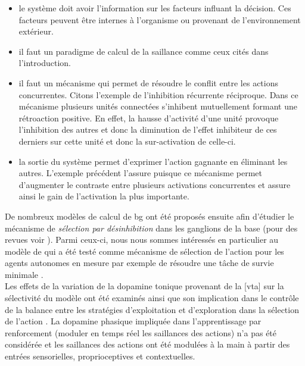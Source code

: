 \begin{itemize}
\item le système doit avoir l'information sur les facteurs influant la décision. Ces facteurs peuvent être internes à l'organisme ou provenant de l'environnement extérieur.
\item il faut un paradigme de calcul de la saillance comme ceux cités dans l'introduction.
\item il faut un mécanisme qui permet de résoudre le conflit entre les actions concurrentes. Citons l'exemple de l'inhibition récurrente réciproque. Dans ce mécanisme plusieurs unités connectées s'inhibent mutuellement formant une rétroaction positive. En effet, la hausse d'activité d'une unité provoque l'inhibition des autres et donc la diminution de l'effet inhibiteur de ces derniers sur cette unité et donc la sur-activation de celle-ci. 
\item la sortie du système permet d'exprimer l'action gagnante en éliminant les autres. L'exemple précédent l'assure puisque ce mécanisme permet d'augmenter le contraste entre plusieurs activations concurrentes et assure ainsi le gain de l'activation la plus importante.\\  
\end{itemize}

De nombreux modèles de calcul de \gls{bg} ont été proposés ensuite afin d'étudier le mécanisme de \textit{sélection par désinhibition} \cite{Chevalier:1990} dans les ganglions de la base (pour des revues voir \cite{Gillies:2000, Gurney:2004}). Parmi ceux-ci, nous nous sommes intéressés en particulier au modèle de \cite{Gurney:2001a,Gurney:2001b} qui a été testé comme mécanisme de sélection de l'action pour les agents autonomes en mesure par exemple de résoudre une tâche de survie minimale  \cite{Girard:2003, Girard:2005a, Gonzalez:2000, Prescott:2006}.\\

Les effets de la variation de la dopamine tonique provenant de la [\gls{vta}] sur la sélectivité du modèle ont été examinés \cite{Gurney:2001b} ainsi que son implication dans le contrôle de la balance entre les stratégies d'exploitation et d'exploration dans la sélection de l'action \cite{Humphries:2012}. La dopamine phasique impliquée dans l'apprentissage par renforcement (moduler en temps réel les saillances des actions) n'a pas été considérée et les saillances des actions ont été modulées à la main à partir des entrées sensorielles, proprioceptives et contextuelles.  \\

